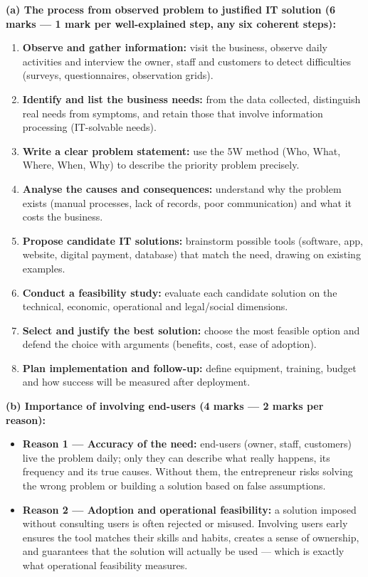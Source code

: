 \documentclass[11pt]{article}
\begin{document}
\begin{corrige}
\textbf{(a) The process from observed problem to justified IT solution (6 marks — 1 mark per well-explained step, any six coherent steps):}
\begin{enumerate}
\item \textbf{Observe and gather information:} visit the business, observe daily activities and interview the owner, staff and customers to detect difficulties (surveys, questionnaires, observation grids).
\item \textbf{Identify and list the business needs:} from the data collected, distinguish real needs from symptoms, and retain those that involve information processing (IT-solvable needs).
\item \textbf{Write a clear problem statement:} use the 5W method (Who, What, Where, When, Why) to describe the priority problem precisely.
\item \textbf{Analyse the causes and consequences:} understand why the problem exists (manual processes, lack of records, poor communication) and what it costs the business.
\item \textbf{Propose candidate IT solutions:} brainstorm possible tools (software, app, website, digital payment, database) that match the need, drawing on existing examples.
\item \textbf{Conduct a feasibility study:} evaluate each candidate solution on the technical, economic, operational and legal/social dimensions.
\item \textbf{Select and justify the best solution:} choose the most feasible option and defend the choice with arguments (benefits, cost, ease of adoption).
\item \textbf{Plan implementation and follow-up:} define equipment, training, budget and how success will be measured after deployment.
\end{enumerate}

\textbf{(b) Importance of involving end-users (4 marks — 2 marks per reason):}
\begin{itemize}
\item \textbf{Reason 1 — Accuracy of the need:} end-users (owner, staff, customers) live the problem daily; only they can describe what really happens, its frequency and its true causes. Without them, the entrepreneur risks solving the wrong problem or building a solution based on false assumptions.
\item \textbf{Reason 2 — Adoption and operational feasibility:} a solution imposed without consulting users is often rejected or misused. Involving users early ensures the tool matches their skills and habits, creates a sense of ownership, and guarantees that the solution will actually be used — which is exactly what operational feasibility measures.
\end{itemize}


\end{corrige}
\end{document}
